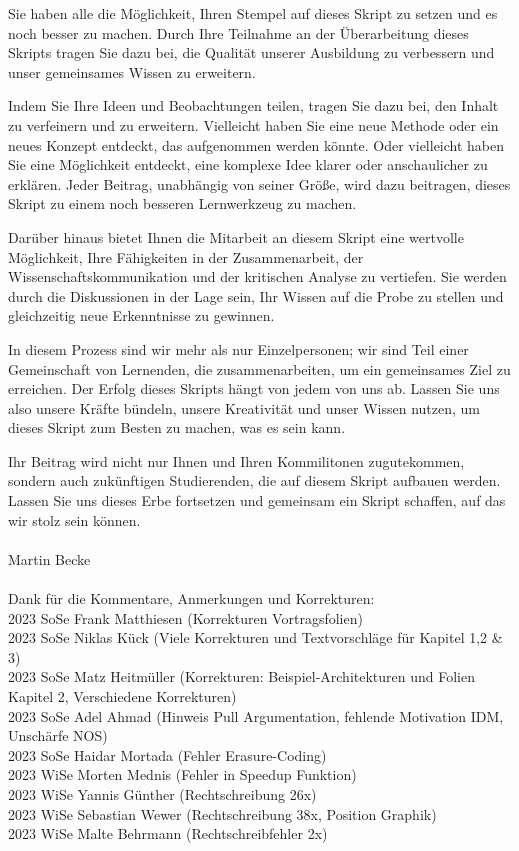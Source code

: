 \documentclass[a4paper]{article}
\begin{document}
Sie haben alle die Möglichkeit, Ihren Stempel auf dieses Skript zu setzen und es noch besser zu machen. Durch Ihre Teilnahme an der Überarbeitung dieses Skripts tragen Sie dazu bei, die Qualität unserer Ausbildung zu verbessern und unser gemeinsames Wissen zu erweitern.

Indem Sie Ihre Ideen und Beobachtungen teilen, tragen Sie dazu bei, den Inhalt zu verfeinern und zu erweitern. Vielleicht haben Sie eine neue Methode oder ein neues Konzept entdeckt, das aufgenommen werden könnte. Oder vielleicht haben Sie eine Möglichkeit entdeckt, eine komplexe Idee klarer oder anschaulicher zu erklären. Jeder Beitrag, unabhängig von seiner Größe, wird dazu beitragen, dieses Skript zu einem noch besseren Lernwerkzeug zu machen.

Darüber hinaus bietet Ihnen die Mitarbeit an diesem Skript eine wertvolle Möglichkeit, Ihre Fähigkeiten in der Zusammenarbeit, der Wissenschaftskommunikation und der kritischen Analyse zu vertiefen. Sie werden durch die Diskussionen in der Lage sein, Ihr Wissen auf die Probe zu stellen und gleichzeitig neue Erkenntnisse zu gewinnen.

In diesem Prozess sind wir mehr als nur Einzelpersonen; wir sind Teil einer Gemeinschaft von Lernenden, die zusammenarbeiten, um ein gemeinsames Ziel zu erreichen. Der Erfolg dieses Skripts hängt von jedem von uns ab. Lassen Sie uns also unsere Kräfte bündeln, unsere Kreativität und unser Wissen nutzen, um dieses Skript zum Besten zu machen, was es sein kann.

Ihr Beitrag wird nicht nur Ihnen und Ihren Kommilitonen zugutekommen, sondern auch zukünftigen Studierenden, die auf diesem Skript aufbauen werden. Lassen Sie uns dieses Erbe fortsetzen und gemeinsam ein Skript schaffen, auf das wir stolz sein können.
\\\\
Martin Becke
\\\\
Dank für die Kommentare, Anmerkungen und Korrekturen:  \\
2023 SoSe Frank Matthiesen (Korrekturen Vortragsfolien) \\
2023 SoSe Niklas Kück (Viele Korrekturen und Textvorschläge für Kapitel 1,2 \& 3)\\
2023 SoSe Matz Heitmüller (Korrekturen: Beispiel-Architekturen und Folien Kapitel 2, Verschiedene Korrekturen) \\
2023 SoSe Adel Ahmad (Hinweis Pull Argumentation, fehlende Motivation IDM, Unschärfe NOS) \\
2023 SoSe Haidar Mortada (Fehler  Erasure-Coding) \\
2023 WiSe Morten Mednis (Fehler in Speedup Funktion) \\
2023 WiSe Yannis Günther (Rechtschreibung 26x) \\
2023 WiSe Sebastian Wewer (Rechtschreibung 38x, Position Graphik) \\
2023 WiSe Malte Behrmann (Rechtschreibfehler 2x)\\
\\
\end{document}
